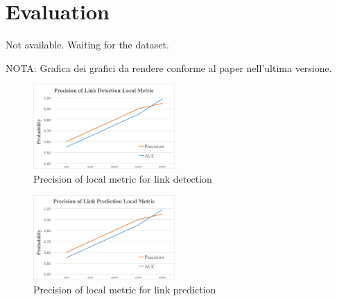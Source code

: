\section{Evaluation}
\label{sec:evaluation}

Not available. Waiting for the dataset.

NOTA: Grafica dei grafici da rendere conforme al paper nell'ultima versione.


\begin{figure}[!ht]
	\centering
	\includegraphics[width=0.48\textwidth]{graphs/graph_detection.png}
	\caption{Precision of local metric for link detection}
	\label{fig:graph-detection}
\end{figure}

\begin{figure}[!ht]
	\centering
	\includegraphics[width=0.48\textwidth]{graphs/graph_prediction.png}
	\caption{Precision of local metric for link prediction}
	\label{fig:graph-prediction}
\end{figure}




